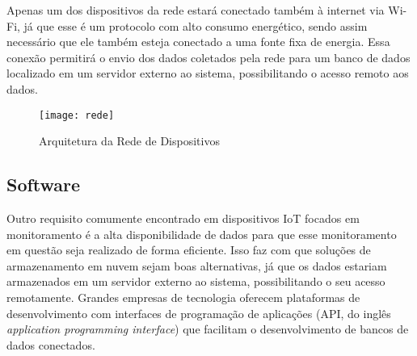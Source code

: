 \documentclass[../monografia.tex]{subfiles}
\begin{document}
Apenas um dos dispositivos da rede estará conectado também à internet via Wi-Fi, já que esse é um protocolo com alto consumo energético, sendo assim necessário que ele também esteja conectado a uma fonte fixa de energia. Essa conexão permitirá o envio dos dados coletados pela rede para um banco de dados localizado em um servidor externo ao sistema, possibilitando o acesso remoto aos dados.

\begin{figure}[h]
\centering
    \texttt{[image: rede]}
    \caption{Arquitetura da Rede de Dispositivos}
    \label{fig:rede}
\end{figure}

\subsection{Software}
Outro requisito comumente encontrado em dispositivos IoT focados em monitoramento é a alta disponibilidade de dados para que esse monitoramento em questão seja realizado de forma eficiente. Isso faz com que soluções de armazenamento em nuvem sejam boas alternativas, já que os dados estariam armazenados em um servidor externo ao sistema, possibilitando o seu acesso remotamente. Grandes empresas de tecnologia oferecem plataformas de desenvolvimento com interfaces de programação de aplicações (API, do inglês \textit{application programming interface}) que facilitam o desenvolvimento de bancos de dados conectados.

\end{document}
